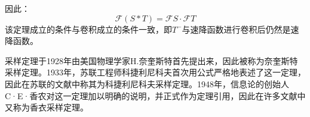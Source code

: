 因此：
\begin{equation}
	\mathcal{F}(S*T)=\mathcal{F}S\cdot \mathcal{F}T
\end{equation}
该定理成立的条件与卷积成立的条件一致，即$T^−$与速降函数进行卷积后仍然是速降函数。

采样定理于1928年由美国物理学家H.奈奎斯特首先提出来，因此被称为奈奎斯特采样定理。1933年，苏联工程师科捷利尼科夫首次用公式严格地表述了这一定理，因此在苏联的文献中称其为科捷利尼科夫采样定理。1948年，信息论的创始人C·E·香农对这一定理加以明确的说明，并正式作为定理引用，因此在许多文献中又称为香衣采样定理。